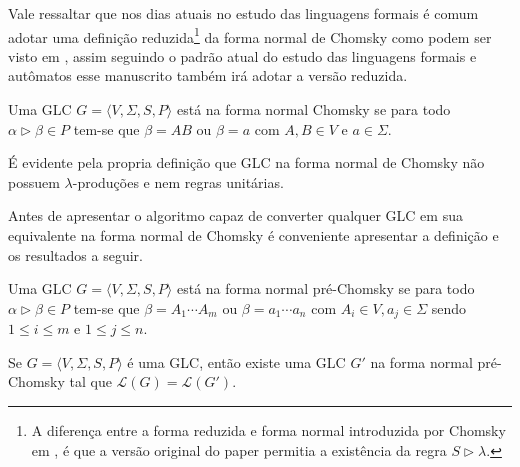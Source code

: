 Vale ressaltar que nos dias atuais no estudo das linguagens formais é comum adotar uma definição reduzida\footnote{A diferença entre a forma reduzida e forma normal introduzida por Chomsky em \cite{chomsky1959}, é que a versão original do paper permitia a existência da regra $S \rhd \lambda$.} da forma normal de Chomsky como podem ser visto em \cite{benjaLivro2010, hopcroft2008, menezes1998LFA}, assim seguindo o padrão atual do estudo das linguagens formais e autômatos esse manuscrito também irá adotar a versão reduzida.

\begin{definition}\label{def:NormalChomsky}
    Uma GLC $G = \langle V, \Sigma, S, P \rangle$ está na forma normal Chomsky se para todo $\alpha \rhd \beta \in P$ tem-se que $\beta = AB$ ou $\beta = a$ com $A, B \in V$ e $a \in \Sigma$.
\end{definition}

\begin{remark}
    É evidente pela propria definição que GLC na forma normal de Chomsky não possuem $\lambda$-produções e nem regras unitárias.
\end{remark}

Antes de apresentar o algoritmo capaz de converter qualquer GLC em sua equivalente na forma normal de Chomsky é conveniente apresentar a definição e os resultados a seguir.

\begin{definition}\label{def:NormalPreChomsky}
    Uma GLC $G = \langle V, \Sigma, S, P \rangle$ está na forma normal pré-Chomsky se para todo $\alpha \rhd \beta \in P$ tem-se que $\beta = A_1\cdots A_m$ ou $\beta = a_1\cdots a_n$ com $A_i \in V, a_j \in \Sigma$ sendo $1 \leq i \leq m$ e $1 \leq j \leq n$.
\end{definition}

\begin{lemma}\label{lema:PreChomsky}
    Se $G = \langle V, \Sigma, S, P \rangle$ é uma GLC, então existe uma GLC $G'$ na forma normal pré-Chomsky tal que $\mathcal{L}(G) = \mathcal{L}(G')$.
\end{lemma}


